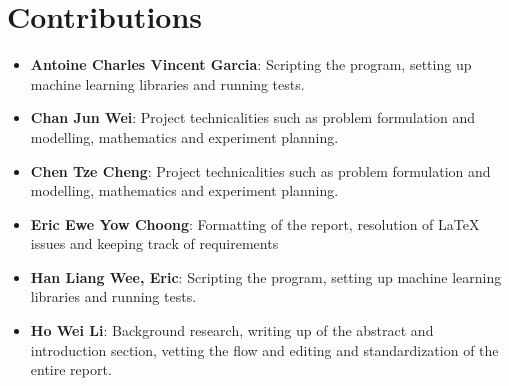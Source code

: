 \documentclass{article}
\begin{document}
	\section{Contributions}
	\begin{itemize}
		\item \textbf{Antoine Charles Vincent Garcia}: 
		Scripting the program, setting up machine learning libraries and running tests.
		\item \textbf{Chan Jun Wei}: 
		Project technicalities such as problem formulation and modelling, mathematics and experiment planning.
		\item \textbf{Chen Tze Cheng}: 
		Project technicalities such as problem formulation and modelling, mathematics and experiment planning.
		\item \textbf{Eric Ewe Yow Choong}: 
		Formatting of the report, resolution of LaTeX issues and keeping track of requirements
		\item \textbf{Han Liang Wee, Eric}: 
		Scripting the program, setting up machine learning libraries and running tests.
		\item \textbf{Ho Wei Li}: 
		Background research, writing up of the abstract and introduction section, vetting the flow and editing and standardization of the entire report. \\
	\end{itemize}
	
	
	{\scriptsize }
\end{document}
